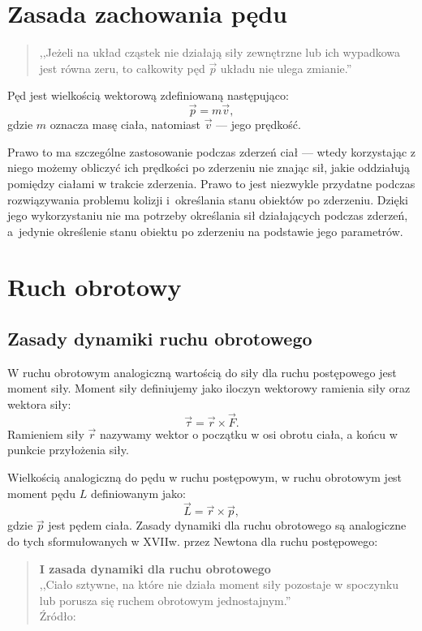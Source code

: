 \section{Zasada zachowania pędu}
\label{part:zachowaniapedu}
\begin{quotation}
	,,Jeżeli na układ cząstek nie działają siły zewnętrzne lub ich wypadkowa jest równa zeru, to całkowity pęd $\vec{p}$ układu nie ulega zmianie.''\newline
	\cite[Strona 216, rozdział 9.6]{bib:resnick1}
\end{quotation}

Pęd jest wielkością wektorową zdefiniowaną następująco:
\begin{equation}
\vec{p} = m\vec{v},
\end{equation}
gdzie $m$ oznacza masę ciała, natomiast $\vec{v}$ --- jego prędkość.

Prawo to ma szczególne zastosowanie podczas zderzeń ciał --- wtedy korzystając z niego możemy obliczyć ich prędkości po zderzeniu nie znając sił, jakie oddziałują pomiędzy ciałami w trakcie zderzenia.
Prawo to jest niezwykle przydatne podczas rozwiązywania problemu kolizji i~określania stanu obiektów po zderzeniu. Dzięki jego wykorzystaniu nie ma potrzeby określania sił działających podczas zderzeń, a~jedynie określenie stanu obiektu po zderzeniu na podstawie jego parametrów.
\section{Ruch obrotowy}
\subsection{Zasady dynamiki ruchu obrotowego}
\label{part:zasadydynamikiobr}
W ruchu obrotowym analogiczną wartością do siły dla ruchu postępowego jest moment siły. Moment siły definiujemy jako iloczyn wektorowy ramienia siły oraz wektora siły:
\begin{equation}
\label{eq:moment-sily}
\vec{\tau} = \vec{r} \times \vec{F}.
\end{equation}
Ramieniem siły $\vec{r}$ nazywamy wektor o początku w osi obrotu ciała, a końcu w punkcie przyłożenia siły. 

Wielkością analogiczną do pędu w ruchu postępowym, w ruchu obrotowym jest moment pędu $L$ definiowanym jako:
\begin{equation}
\label{eq:moment-pedu}
\vec{L} = \vec{r} \times \vec{p},
\end{equation}
gdzie $\vec{p}$ jest pędem ciała.
Zasady dynamiki dla ruchu obrotowego są analogiczne do tych sformułowanych w XVIIw. przez Newtona dla ruchu postępowego:
\begin{quotation}
	\textbf{I zasada dynamiki dla ruchu obrotowego}\\
	,,Ciało sztywne, na które nie działa moment siły pozostaje w spoczynku lub porusza się ruchem obrotowym jednostajnym.'' \\	
	Źródło: \cite{bib:kakol}
\end{quotation}

